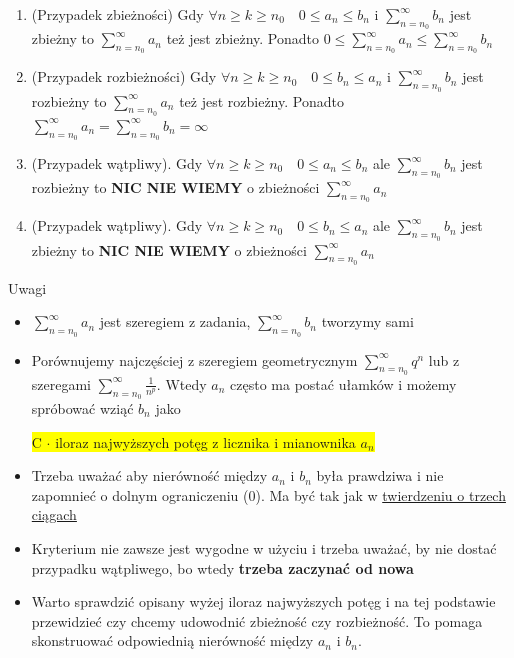 \documentclass[12pt]{article}
\begin{document}
\begin{enumerate}
    \item (Przypadek zbieżności) Gdy $ \forall n \geq k \geq n_0 \quad 0 \leq a_n \leq b_n $ i $ \sum\limits_{n = n_0}^{\infty} b_n $
    jest zbieżny to $ \sum\limits_{n = n_0}^{\infty} a_n $ też jest zbieżny. Ponadto
    $ 0 \leq \sum\limits_{n = n_0}^{\infty} a_n \leq \sum\limits_{n = n_0}^{\infty} b_n $
    
    \item (Przypadek rozbieżności) Gdy $ \forall n \geq k \geq n_0 \quad 0 \leq b_n \leq a_n $ i $ \sum\limits_{n = n_0}^{\infty} b_n $
    jest rozbieżny to $ \sum\limits_{n = n_0}^{\infty} a_n $ też jest rozbieżny. Ponadto
    $ \sum\limits_{n = n_0}^{\infty} a_n = \sum\limits_{n = n_0}^{\infty} b_n = \infty $

    \item (Przypadek wątpliwy). Gdy $ \forall n \geq k \geq n_0 \quad 0 \leq a_n \leq b_n $ ale $ \sum\limits_{n = n_0}^{\infty} b_n $ jest
    rozbieżny to \textbf{NIC NIE WIEMY} o zbieżności $ \sum\limits_{n = n_0}^{\infty} a_n $

    \item (Przypadek wątpliwy). Gdy $ \forall n \geq k \geq n_0 \quad 0 \leq b_n \leq a_n $ ale $ \sum\limits_{n = n_0}^{\infty} b_n $ jest
    zbieżny to \textbf{NIC NIE WIEMY} o zbieżności $ \sum\limits_{n = n_0}^{\infty} a_n $ \\
\end{enumerate}

Uwagi

\begin{itemize}
    \item $ \sum\limits_{n = n_0}^{\infty} a_n $ jest szeregiem z zadania, $ \sum\limits_{n = n_0}^{\infty} b_n $ tworzymy sami
    \item Porównujemy najczęściej z szeregiem geometrycznym $ \sum\limits_{n = n_0}^{\infty} q^n $ lub z szeregami
    $ \sum\limits_{n = n_0}^{\infty} \frac{1}{n^p} $. Wtedy $a_n$ często ma postać ułamków i możemy spróbować wziąć $b_n$ jako

    \quad \colorbox{yellow}{C $\cdot$ iloraz najwyższych potęg z licznika i mianownika $a_n$} 

    \item Trzeba uważać aby nierówność między $a_n$ i $b_n$ była prawdziwa i nie zapomnieć o dolnym ograniczeniu (0). Ma być
    tak jak w \underline{twierdzeniu o trzech ciągach}

    \item Kryterium nie zawsze jest wygodne w użyciu i trzeba uważać, by nie dostać przypadku wątpliwego, bo wtedy \textbf{trzeba zaczynać od nowa}
    
    \item Warto sprawdzić opisany wyżej iloraz najwyższych potęg i na tej podstawie przewidzieć czy chcemy udowodnić zbieżność
    czy rozbieżność. To pomaga skonstruować odpowiednią nierówność między $a_n$ i $b_n$.
\end{itemize}
\end{document}
